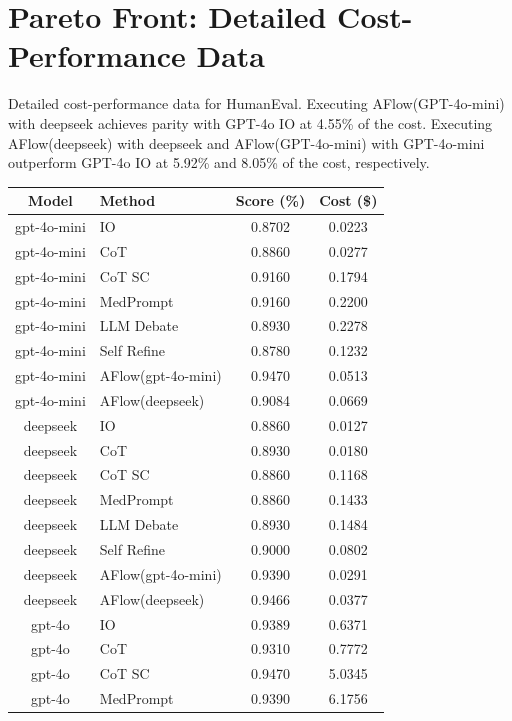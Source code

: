 \documentclass{article} %
\newcommand{\model}{{\sc AFlow}\xspace}
\theoremstyle{plain}
\theoremstyle{definition}
\theoremstyle{remark}
\begin{document}
\section{Pareto Front: Detailed Cost-Performance Data}
\label{appendix:cost}
Detailed cost-performance data for HumanEval. Executing \model(GPT-4o-mini) with deepseek achieves parity with GPT-4o IO at 4.55\% of the cost. Executing  \model(deepseek) with deepseek and AFlow(GPT-4o-mini) with GPT-4o-mini outperform GPT-4o IO at 5.92\% and 8.05\% of the cost, respectively.


\begin{table}[h]
\renewcommand\arraystretch{1.2}
\setlength{\arrayrulewidth}{0.8pt}
\setlength{\tabcolsep}{4pt}
\setlength{\abovecaptionskip}{0.1cm}
\setlength{\belowcaptionskip}{-0.2cm}
\centering
\begin{tabular*}{\textwidth}{@{\extracolsep{\fill}}clcc@{}}
\hline
Model & Method & Score (\%) & Cost (\$)\\
\hline
gpt-4o-mini & IO & 0.8702 & 0.0223 \\
gpt-4o-mini & CoT & 0.8860 & 0.0277 \\
gpt-4o-mini & CoT SC & 0.9160 & 0.1794 \\
gpt-4o-mini & MedPrompt & 0.9160 & 0.2200 \\
gpt-4o-mini & LLM Debate & 0.8930 & 0.2278 \\
gpt-4o-mini & Self Refine & 0.8780 & 0.1232 \\
gpt-4o-mini & \model(gpt-4o-mini) & 0.9470 & 0.0513 \\
gpt-4o-mini & \model(deepseek) & 0.9084 & 0.0669 \\
deepseek & IO & 0.8860 & 0.0127 \\
deepseek & CoT & 0.8930 & 0.0180 \\
deepseek & CoT SC & 0.8860 & 0.1168 \\
deepseek & MedPrompt & 0.8860 & 0.1433 \\
deepseek & LLM Debate & 0.8930 & 0.1484 \\
deepseek & Self Refine & 0.9000 & 0.0802 \\
deepseek & \model(gpt-4o-mini) & 0.9390 & 0.0291 \\
deepseek & \model(deepseek) & 0.9466 & 0.0377 \\
gpt-4o & IO & 0.9389 & 0.6371 \\
gpt-4o & CoT & 0.9310 & 0.7772 \\
gpt-4o & CoT SC & 0.9470 & 5.0345 \\
gpt-4o & MedPrompt & 0.9390 & 6.1756 \\

\end{tabular*}
\end{table}
\end{document}
